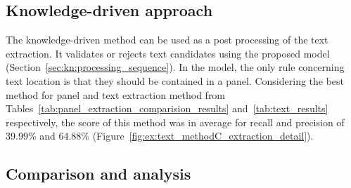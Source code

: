 




\subsection{Knowledge-driven approach} %

The knowledge-driven method can be used as a post processing of the text extraction.
It validates or rejects text candidates using the proposed model (Section~\ref{sec:kn:processing_sequence}).
In the model, the only rule concerning text location is that they should be contained in a panel.
Considering the best method for panel and text extraction method from Tables~\ref{tab:panel_extraction_comparision_results} and~\ref{tab:text_results} respectively, the score of this method was in average for recall and precision of 39.99\% and 64.88\% (Figure~\ref{fig:ex:text_methodC_extraction_detail}).







\subsection{Comparison and analysis} %
\label{sub:results_analysis}

